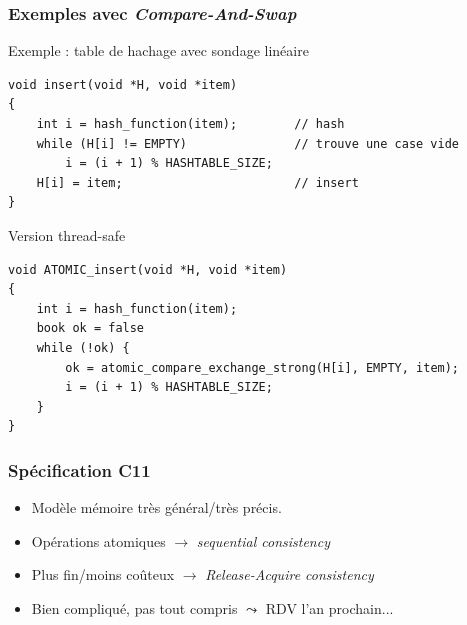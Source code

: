 \documentclass[xcolor={x11names,svgnames}]{beamer}
\begin{document}
\begin{frame}[fragile, label=CAS_hash]
  \frametitle{Exemples avec \emph{Compare-And-Swap}}

  \begin{exampleblock}{Exemple : table de hachage avec sondage linéaire}
\begin{verbatim}
void insert(void *H, void *item)
{
    int i = hash_function(item);        // hash
    while (H[i] != EMPTY)               // trouve une case vide
        i = (i + 1) % HASHTABLE_SIZE;        
    H[i] = item;                        // insert
}
\end{verbatim}
  \end{exampleblock}

\medskip
  
  \begin{alertblock}{Version thread-safe}
\begin{verbatim}
void ATOMIC_insert(void *H, void *item)
{
    int i = hash_function(item);
    book ok = false
    while (!ok) {
        ok = atomic_compare_exchange_strong(H[i], EMPTY, item);
        i = (i + 1) % HASHTABLE_SIZE;        
    }
}
\end{verbatim}
  \end{alertblock}
\end{frame}



\begin{frame}[label=C11]
  \frametitle{Spécification C11}

  \begin{itemize}
  \item Modèle mémoire très général/très précis.

    \medskip
    
  \item Opérations atomiques $\rightarrow$ \emph{sequential consistency}
  \item Plus fin/moins coûteux $\rightarrow$ \emph{Release-Acquire consistency}
    \medskip

  \item Bien compliqué, pas tout compris $\leadsto$ RDV l'an prochain...
  \end{itemize}
\end{frame}
\end{document}

